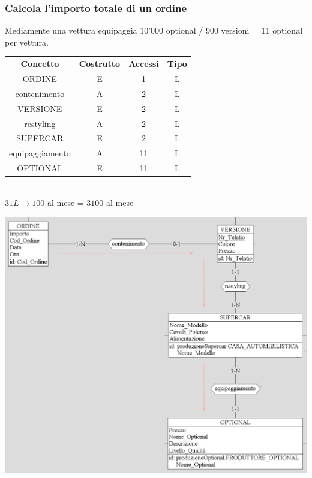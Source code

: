 \documentclass[11pt]{article}
\begin{document}
\subsubsection{Calcola l'importo totale di un ordine} 

Mediamente una vettura equipaggia 10'000 optional / 900 versioni = 11 optional per vettura.

\begin{table}[H]
    \centering
    \begin{tabular}{c c c c}
        \rowcolor{red!20!}
        \textbf{Concetto} & \textbf{Costrutto} & \textbf{Accessi} &
        \textbf{Tipo}\\
        ORDINE & E & 1 & L \\
        contenimento & A & 2 & L \\
        VERSIONE & E & 2 & L \\
        restyling & A & 2 & L \\
        SUPERCAR & E & 2 & L \\
        equipaggiamento & A & 11 & L \\
        OPTIONAL & E & 11 & L \\
    \end{tabular}\\
    \( 31L \rightarrow 100 \) al mese = \( 3100 \) al mese
\end{table}

\begin{center}
    \includegraphics[scale=0.66]{images/navigationSchemes/calcolaOrdine.png}
\end{center}
\end{document}
